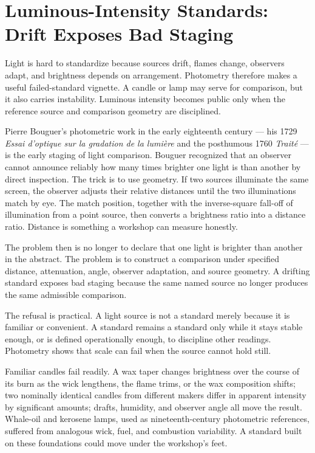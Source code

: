 \section{Luminous-Intensity Standards: Drift Exposes Bad Staging}

Light is hard to standardize because sources drift, flames change, observers
adapt, and brightness depends on arrangement. Photometry therefore makes a
useful failed-standard vignette. A candle or lamp may serve for comparison,
but it also carries instability. Luminous intensity becomes public only
when the reference source and comparison geometry are disciplined.

Pierre Bouguer's photometric work in the early eighteenth century --- his
1729 \emph{Essai d'optique sur la gradation de la lumi\`ere} and the
posthumous 1760 \emph{Trait\'e} --- is the early staging of light
comparison. Bouguer recognized that an observer cannot announce reliably how
many times brighter one light is than another by direct inspection. The
trick is to use geometry. If two sources illuminate the same screen, the
observer adjusts their relative distances until the two illuminations match
by eye. The match position, together with the inverse-square fall-off of
illumination from a point source, then converts a brightness ratio into a
distance ratio. Distance is something a workshop can measure honestly.

The problem then is no longer to declare that one light is brighter than
another in the abstract. The problem is to construct a comparison under
specified distance, attenuation, angle, observer adaptation, and source
geometry. A drifting standard exposes bad staging because the same named
source no longer produces the same admissible comparison.

The refusal is practical. A light source is not a standard merely because
it is familiar or convenient. A standard remains a standard only while it
stays stable enough, or is defined operationally enough, to discipline
other readings. Photometry shows that scale can fail when the source
cannot hold still.

Familiar candles fail readily. A wax taper changes brightness over the
course of its burn as the wick lengthens, the flame trims, or the wax
composition shifts; two nominally identical candles from different makers
differ in apparent intensity by significant amounts; drafts, humidity, and
observer angle all move the result. Whale-oil and kerosene lamps, used as
nineteenth-century photometric references, suffered from analogous wick,
fuel, and combustion variability. A standard built on these foundations
could move under the workshop's feet.

